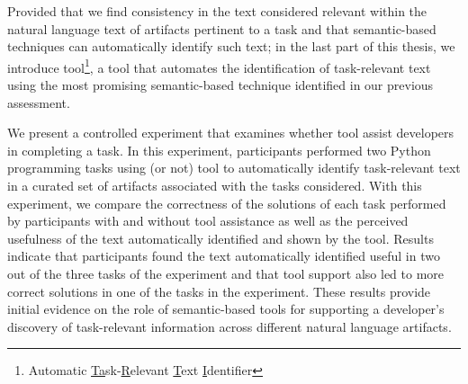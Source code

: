 





Provided that we find consistency in the text considered relevant within the natural language text of artifacts pertinent to a task and that semantic-based techniques can automatically identify such text; in the last part of this thesis, 
we introduce \acs{tool}\footnote{
    Automatic \underline{Ta}sk-\underline{R}elevant \underline{T}ext \underline{I}dentifier
}, a tool that automates the identification of task-relevant text using the most promising semantic-based technique identified in our previous assessment.








We present a controlled experiment that examines whether \acs{tool} 
assist developers in completing a task. 
In this experiment, participants 
performed two Python programming tasks using (or not) \acs{tool}
to automatically identify task-relevant text 
in a curated set of artifacts associated with the tasks considered. 
With this experiment, we compare the correctness of the solutions of each task 
performed by participants with and without tool assistance
as well as the perceived usefulness of the text automatically identified and shown by the tool. 
Results indicate that participants found the text automatically identified
useful in two out of the three tasks of the experiment
and that tool support also led to more correct solutions 
in one of the tasks in the experiment. These results provide
initial evidence on the role of semantic-based tools 
for supporting a developer's discovery of task-relevant information
across different natural language artifacts.









